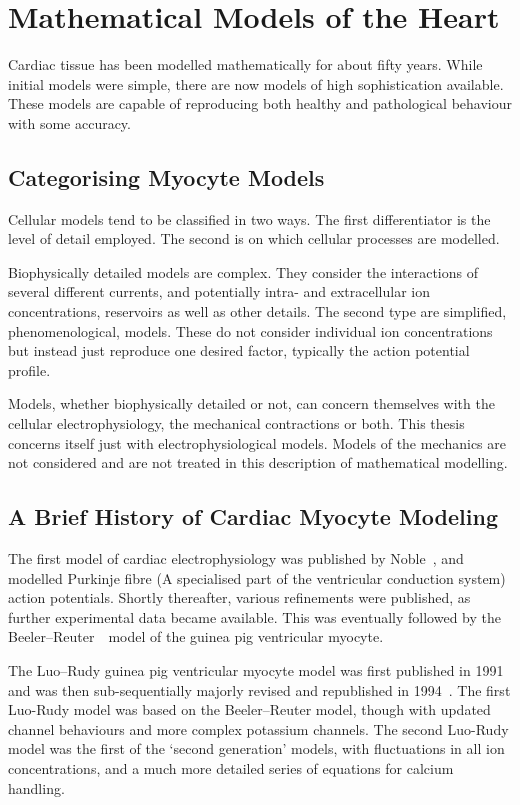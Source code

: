 \section{Mathematical Models of the Heart}

Cardiac tissue has been modelled mathematically for about fifty years.
While initial models were simple, there are now models of high sophistication
available.
These models are capable of reproducing both healthy and pathological behaviour
with some accuracy.

\subsection{Categorising Myocyte Models}

Cellular models tend to be classified in two ways.
The first differentiator is the level of detail employed.
The second is on which cellular processes are modelled.

Biophysically detailed models are complex.
They consider the interactions of several different currents, and potentially
intra- and extracellular ion concentrations, reservoirs as well as other
details.
The second type are simplified, phenomenological, models.
These do not consider individual ion concentrations but instead just reproduce
one desired factor, typically the action potential profile.

Models, whether biophysically detailed or not, can concern themselves with the
cellular electrophysiology, the mechanical contractions or both.
This thesis concerns itself just with electrophysiological models.
Models of the mechanics are not considered and are not treated in this
description of mathematical modelling.

\subsection{A Brief History of Cardiac Myocyte Modeling}

The first model of cardiac electrophysiology was published by
Noble~\cite{Noble1962}, and modelled Purkinje fibre (A specialised part of the
ventricular conduction system) action potentials.
Shortly thereafter, various refinements were published, as further experimental
data became available.
This was eventually followed by the Beeler--Reuter~\cite{Beeler1977}\ model of
the guinea pig ventricular myocyte.

The Luo--Rudy guinea pig ventricular myocyte model was first published in
1991~\cite{Luo1991} and was then sub-sequentially majorly revised and
republished in 1994~\cite{Luo1994}.
The first Luo-Rudy model was based on the Beeler--Reuter model, though with updated channel behaviours
and more complex potassium channels.
The second Luo-Rudy model was the first of the `second generation' models,
with fluctuations in all ion concentrations, and a much more detailed series of
equations for calcium handling.

